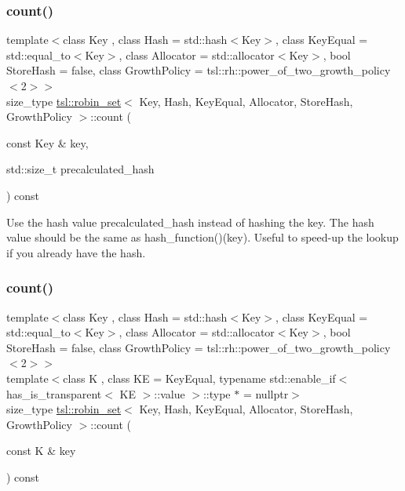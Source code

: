 \subsubsection{\texorpdfstring{count()}{count()}\hspace{0.1cm}{\footnotesize\ttfamily [1/3]}}
{\footnotesize\ttfamily template$<$class Key , class Hash  = std\+::hash$<$\+Key$>$, class Key\+Equal  = std\+::equal\+\_\+to$<$\+Key$>$, class Allocator  = std\+::allocator$<$\+Key$>$, bool Store\+Hash = false, class Growth\+Policy  = tsl\+::rh\+::power\+\_\+of\+\_\+two\+\_\+growth\+\_\+policy$<$2$>$$>$ \\
size\+\_\+type \mbox{\hyperlink{classtsl_1_1robin__set}{tsl\+::robin\+\_\+set}}$<$ Key, Hash, Key\+Equal, Allocator, Store\+Hash, Growth\+Policy $>$\+::count (\begin{DoxyParamCaption}\item[{const Key \&}]{key,  }\item[{std\+::size\+\_\+t}]{precalculated\+\_\+hash }\end{DoxyParamCaption}) const\hspace{0.3cm}{\ttfamily [inline]}}

Use the hash value \textquotesingle{}precalculated\+\_\+hash\textquotesingle{} instead of hashing the key. The hash value should be the same as hash\+\_\+function()(key). Useful to speed-\/up the lookup if you already have the hash. \mbox{\label{classtsl_1_1robin__set_a91ae518053a1ba2ed995498e27cd8649}} 
\subsubsection{\texorpdfstring{count()}{count()}\hspace{0.1cm}{\footnotesize\ttfamily [2/3]}}
{\footnotesize\ttfamily template$<$class Key , class Hash  = std\+::hash$<$\+Key$>$, class Key\+Equal  = std\+::equal\+\_\+to$<$\+Key$>$, class Allocator  = std\+::allocator$<$\+Key$>$, bool Store\+Hash = false, class Growth\+Policy  = tsl\+::rh\+::power\+\_\+of\+\_\+two\+\_\+growth\+\_\+policy$<$2$>$$>$ \\
template$<$class K , class KE  = Key\+Equal, typename std\+::enable\+\_\+if$<$ has\+\_\+is\+\_\+transparent$<$ K\+E $>$\+::value $>$\+::type $\ast$  = nullptr$>$ \\
size\+\_\+type \mbox{\hyperlink{classtsl_1_1robin__set}{tsl\+::robin\+\_\+set}}$<$ Key, Hash, Key\+Equal, Allocator, Store\+Hash, Growth\+Policy $>$\+::count (\begin{DoxyParamCaption}\item[{const K \&}]{key }\end{DoxyParamCaption}) const\hspace{0.3cm}{\ttfamily [inline]}}

